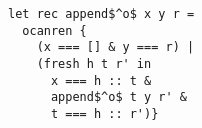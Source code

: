 \begin{lstlisting}
let rec append$^o$ x y r =
  ocanren {
    (x === [] & y === r) |
    (fresh h t r' in
      x === h :: t &
      append$^o$ t y r' &
      t === h :: r')}
\end{lstlisting}